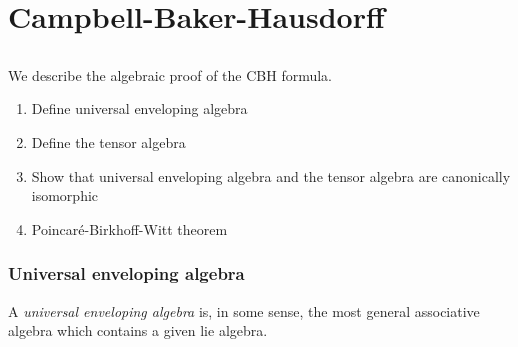 \chapter{Campbell-Baker-Hausdorff}
\label{cha:campbell-baker-hausdorff}
\section{}
We describe the algebraic proof of the CBH formula. 

\begin{enumerate}
    \makethislistcompact
    \item Define universal enveloping algebra
    \item Define the tensor algebra
    \item Show that universal enveloping algebra and the tensor algebra are canonically isomorphic
    \item Poincaré-Birkhoff-Witt theorem
\end{enumerate}

\subsection{Universal enveloping algebra}
\label{sub:universal_enveloping_algebra}

A \emph{universal enveloping algebra} is, in some sense, the most general associative algebra which contains a given lie algebra. 

